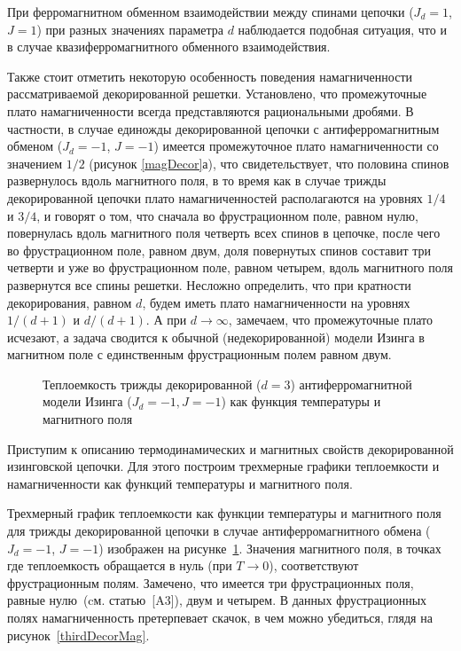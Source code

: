 При ферромагнитном обменном взаимодействии между спинами цепочки ($J_d=1$, $J=1$) при разных значениях параметра $d$ наблюдается подобная ситуация, что и в случае квазиферромагнитного обменного взаимодействия.

Также стоит отметить некоторую особенность поведения намагниченности рассматриваемой декорированной решетки. Установлено, что промежуточные плато намагниченности всегда представляются рациональными дробями. В частности, в случае единожды декорированной цепочки с антиферромагнитным обменом ($J_d=-1$, $J=-1$) имеется промежуточное плато намагниченности со значением $1/2$ (рисунок \ref{magDecor}а), что свидетельствует, что половина спинов развернулось вдоль магнитного поля, в то время как в случае трижды декорированной цепочки плато намагниченностей располагаются на уровнях $1/4$ и $3/4$, и говорят о том, что сначала во фрустрационном поле, равном нулю, повернулась вдоль магнитного поля четверть всех спинов в цепочке, после чего во фрустрационном поле, равном двум, доля повернутых спинов составит три четверти и уже во фрустрационном поле, равном четырем, вдоль магнитного поля развернутся все спины решетки. Несложно определить, что при кратности декорирования, равном $d$, будем иметь плато намагниченности на уровнях $1/(d+1)$ и $d/(d+1)$. А при $d \rightarrow \infty$, замечаем, что промежуточные плато исчезают, а задача сводится к обычной (недекорированной) модели Изинга в магнитном поле с единственным фрустрационным полем равном двум.

 \begin{figure}[h]
 	\caption{Теплоемкость трижды декорированной ($d=3$) антиферромагнитной модели Изинга ($J_d=-1, J=-1$) как функция температуры и магнитного поля}
 	\label{thirdDecorHeat}
 \end{figure}

Приступим к описанию термодинамических и магнитных свойств декорированной изинговской цепочки. Для этого построим трехмерные графики теплоемкости и намагниченности как функций температуры и магнитного поля.

Трехмерный график теплоемкости как функции температуры и магнитного поля для трижды декорированной цепочки в случае антиферромагнитного обмена ($J_d=-1$, $J=-1$) изображен на рисунке~\ref{thirdDecorHeat}. Значения магнитного поля, в точках где теплоемкость обращается в нуль (при $T\rightarrow 0$), соответствуют фрустрационным полям. Замечено, что имеется три фрустрационных поля, равные нулю~(cм. статью~[A3]), двум и четырем. В данных фрустрационных полях намагниченность претерпевает скачок, в чем можно убедиться, глядя на рисунок~\ref{thirdDecorMag}.

